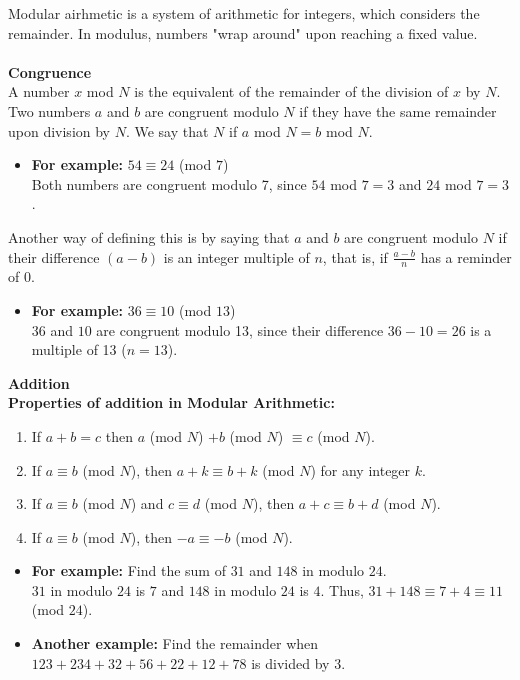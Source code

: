 \begin{justify}
Modular airhmetic is a system of arithmetic for integers, which considers the remainder.
In modulus, numbers "wrap around" upon reaching a fixed value.\\ \\
\textbf{Congruence}\\
A number $x$ mod $N$ is the equivalent of the remainder of the division of $x$ by $N$.
Two numbers $a$ and $b$ are congruent modulo $N$ if they have the same remainder
upon division by $N$. We say that $N$ if $a$ mod $N = b$ mod $N$.
\begin{itemize}
\item \textbf{For example:} $54 \equiv 24$ (mod $7$)\\Both numbers are congruent modulo 7, 
since $54$ mod $7 = 3$ and $24$ mod $7 = 3$.
\end{itemize}
Another way of defining this is by saying that $a$ and $b$ are congruent modulo $N$ if their 
difference $(a-b)$ is an integer multiple of $n$, that is, if $\frac{a - b}{n}$ has a reminder of 0.
\begin{itemize}
\item \textbf{For example:} $36 \equiv 10$ (mod $13$)\\$36$ and $10$ are congruent modulo 13, since
their difference $36-10 = 26$ is a multiple of 13 ($n = 13$).
\end{itemize}
\textbf{Addition}\\
\textbf{Properties of addition in Modular Arithmetic:}
\begin{enumerate}
\item If $a + b = c$ then $a$ (mod $N$) $+ b$ (mod $N$) $\equiv c$ (mod $N$).
\item If $a \equiv b$ (mod $N$), then $a + k \equiv b + k$ (mod $N$) for any integer $k$.
\item If $a \equiv b$ (mod $N$) and $c \equiv d$ (mod $N$), then $a + c \equiv b + d$ (mod $N$).
\item If $a \equiv b$ (mod $N$), then $-a \equiv -b$ (mod $N$).
\end{enumerate}
\begin{itemize}
\item \textbf{For example:} Find the sum of $31$ and $148$ in modulo $24$.\\
$31$ in modulo $24$ is $7$ and $148$ in modulo $24$ is $4$. Thus, $31 + 148 \equiv 7 + 4 \equiv 11$ (mod $24$).
\item \textbf{Another example:} Find the remainder when $123 + 234 + 32 + 56 + 22 + 12 + 78$ is divided by $3$.\\

\end{itemize}
\end{justify}
